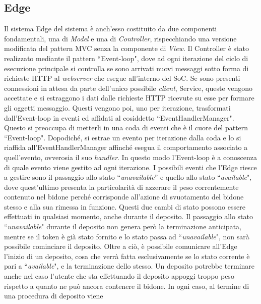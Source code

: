 \documentclass[a4paper, 12pt]{report}
\begin{document}
			\subsection{Edge}
			Il sistema Edge del sistema è anch'esso costituito da due componenti fondamentali, una di
			\textit{Model} e una di \textit{Controller}, rispecchiando una versione modificata del
			pattern MVC senza la componente di \textit{View}.\newline
			Il Controller è stato realizzato mediante il pattern ``Event-loop", dove ad ogni iterazione
			del ciclo di esecuzione principale si controlla se sono arrivati nuovi messaggi sotto forma
			di richieste HTTP al \textit{webserver} che esegue all'interno del SoC. Se sono presenti connessioni in attesa
			da parte dell'unico possibile \textit{client}, Service, queste vengono accettate e si
			estraggono i dati dalle richieste HTTP ricevute su esse per formare gli oggetti messaggio. Questi vengono poi, uno per
			iterazione, trasformati dall'Event-loop in eventi ed affidati al cosiddetto ``EventHandlerManager". 
			Questo si preoccupa di metterli in una coda di eventi che è il cuore
			del pattern ``Event-loop". Dopodiché, si estrae un evento per iterazione dalla coda e lo si
			riaffida all'EventHandlerManager affinché esegua il comportamento associato a
			quell'evento, ovverosia il suo \textit{handler}. In questo modo l'Event-loop è a conoscenza
			di quale evento viene gestito ad ogni iterazione.\newline
			I possibili eventi che
			l'Edge riesce a gestire sono il passaggio allo stato ``\textit{unavailable}'' e quello allo
			stato ``\textit{available}", dove quest'ultimo presenta la particolarità di azzerare il peso
			correntemente contenuto nel bidone perché corrisponde all'azione di svuotamento del bidone
			stesso e alla sua rimessa in funzione. Questi due cambi di stato possono essere effettuati
			in qualsiasi momento, anche durante il deposito. Il passaggio allo stato
			``\textit{unavailable}" durante il deposito non genera però la terminazione anticipata,
			mentre se il token è già stato fornito e lo stato passa ad ``\textit{unavailable}", non sarà
			possibile cominciare il deposito.
			Oltre a ciò, è possibile comunicare all'Edge l'inizio
			di un deposito, cosa che verrà fatta esclusivamente se lo stato corrente è pari a
			``\textit{available}", e la terminazione dello stesso. Un deposito potrebbe terminare anche nel
			caso l'utente che sta effettuando il deposito appoggi troppo peso rispetto a quanto ne può
			ancora contenere il bidone. In ogni caso, al termine di una procedura di deposito viene
\end{document}
